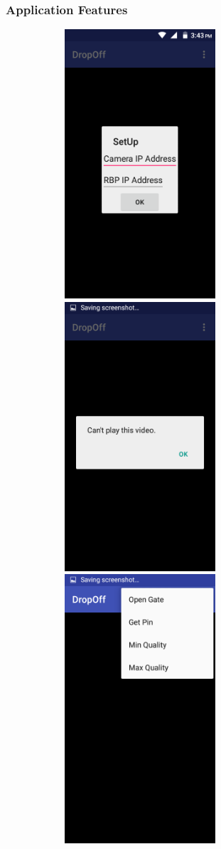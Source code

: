 \documentclass[a4paper,12pt]{article}
\begin{document}
			\subsubsection{Application Features}
			\includegraphics[width=10cm,height=10cm,keepaspectratio]{./Pictures/a1.png}
			\includegraphics[width=10cm,height=10cm,keepaspectratio]{./Pictures/a2.png}
			\includegraphics[width=10cm,height=10cm,keepaspectratio]{./Pictures/a3.png}\\
\end{document}
